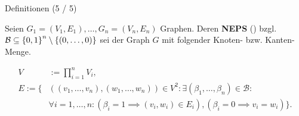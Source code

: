 \documentclass[aspectratio=169]{beamer}
\begin{document}
\begin{frame}{Definitionen (5 / 5)}

  \begin{definition*}[NEPS]

    Seien $G_1 = (V_1, E_1), \dots, G_n = (V_n, E_n)$ Graphen. Deren \textbf{NEPS} () bzgl. $\mathcal B \subseteq {\left \{ 0, 1 \right \}}^n \setminus {\left \{ (0, \dots, 0) \right \}}$ sei der Graph $G$ mit folgender Knoten- bzw. Kanten-Menge.
  
    \begin{align*}
      V & := \prod_{i=1}^n V_i, \\
      E
      :=
      \{ &
        ((v_1, \dots, v_n), (w_1, \dots, w_n)) \in V^2:
        \exists (\beta_1, \dots, \beta_n) \in \mathcal B: \\ &
          \forall i = 1, \dots, n:
            (\beta_i = 1 \implies (v_i, w_i) \in E_i),
            (\beta_i = 0 \implies v_i = w_i)
      \}.
    \end{align*}

  \end{definition*}
  

\end{frame}
\end{document}
